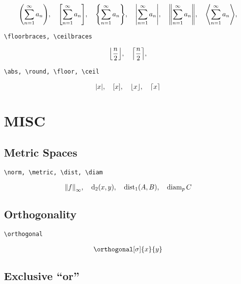 \documentclass{article}
\begin{document}
\begin{align*}
    \pbraces{\sum_{n=1}^\infty a_n},
    \quad
    \bbraces{\sum_{n=1}^\infty a_n},
    \quad
    \Bbraces{\sum_{n=1}^\infty a_n},
    \quad
    \vbraces{\sum_{n=1}^\infty a_n},
    \quad
    \Vbraces{\sum_{n=1}^\infty a_n},
    \quad
    \abraces{\sum_{n=1}^\infty a_n},
\end{align*}

\verb|\floorbraces, \ceilbraces|

\begin{align*}
    \floorbraces{\frac{n}{2}},
    \quad
    \ceilbraces{\frac{n}{2}},
\end{align*}

\verb|\abs, \round, \floor, \ceil|

\begin{align*}
    \abs{x},
    \quad
    \round{x},
    \quad
    \floor{x},
    \quad
    \ceil{x}
\end{align*}


\section{MISC}

\subsection{Metric Spaces}

\verb|\norm, \metric, \dist, \diam|

\begin{align*}
    \norm[\infty]{f},
    \quad
    \metric_2(x, y),
    \quad
    \dist_1(A, B),
    \quad
    \diam_p C
\end{align*}

\subsection{Orthogonality}

\verb|\orthogonal|

\begin{align*}
    \orthogonal[\sigma]{x}{y}
\end{align*}

\subsection{Exclusive \enquote{or}}
\end{document}
